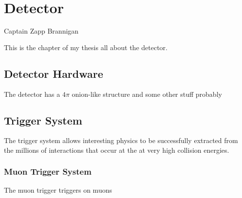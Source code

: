 % 
%
                                              
\chapter{\ATLAS Detector}
\label{chap::Detector}

%
{Captain Zapp Brannigan}

This is the chapter of my thesis all about the \ATLAS detector.

\section{Detector Hardware}
\label{sec::detector_hardware}
The \ATLAS detector\cite{ATLAS} has a $4\pi$ onion-like structure and some other stuff probably  


\section{Trigger System}
\label{sec::detector_trigger}
The trigger system allows interesting physics to be successfully extracted from the millions of interactions that occur at the \LHC at very high collision energies.

\subsection{Muon Trigger System}
\label{subsec::muon_trigger}
The muon trigger triggers on muons

%
